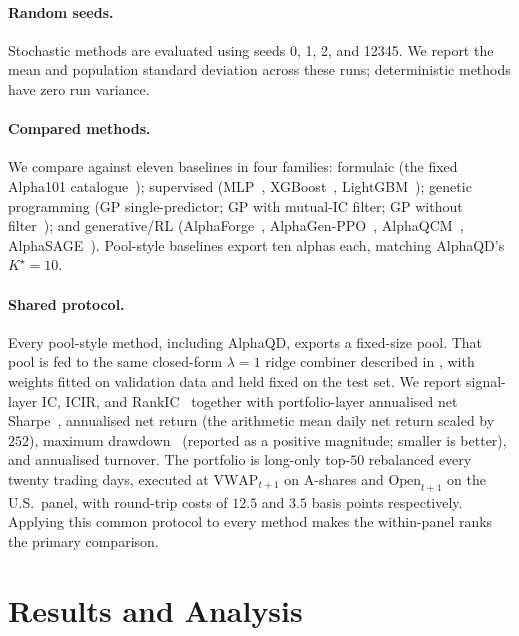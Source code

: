 \paragraph{Random seeds.} Stochastic methods are evaluated using seeds 0, 1, 2, and 12345. We report the mean and population standard deviation across these runs; deterministic methods have zero run variance.

\paragraph{Compared methods.} We compare against eleven baselines in four families: formulaic (the fixed Alpha101 catalogue~\cite{kakushadze2016101}); supervised (MLP~\cite{murtagh1991mlp}, XGBoost~\cite{chen2016xgboost}, LightGBM~\cite{ke2017lightgbm}); genetic programming (GP single-predictor; GP with mutual-IC filter; GP without filter~\cite{stephens2015gplearn}); and generative/RL (AlphaForge~\cite{shi2025alphaforge}, AlphaGen-PPO~\cite{yu2023alphagen}, AlphaQCM~\cite{zhu2025alphaqcm}, AlphaSAGE~\cite{chen2025alphasage}). Pool-style baselines export ten alphas each, matching AlphaQD's $K^\star=10$.

\paragraph{Shared protocol.} Every pool-style method, including AlphaQD, exports a fixed-size pool. That pool is fed to the same closed-form $\lambda=1$ ridge combiner described in , with weights fitted on validation data and held fixed on the test set. We report signal-layer IC, ICIR, and RankIC~\cite{grinold2000active} together with portfolio-layer annualised net Sharpe~\cite{sharpe1994sharpe}, annualised net return (the arithmetic mean daily net return scaled by $252$), maximum drawdown~\cite{magdon2004maximum} (reported as a positive magnitude; smaller is better), and annualised turnover. The portfolio is long-only top-$50$ rebalanced every twenty trading days, executed at $\mathrm{VWAP}_{t+1}$ on A-shares and $\mathrm{Open}_{t+1}$ on the U.S.\ panel, with round-trip costs of $12.5$ and $3.5$ basis points respectively. Applying this common protocol to every method makes the within-panel ranks the primary comparison.

\section{Results and Analysis}
\label{sec:alphaqd_results}

